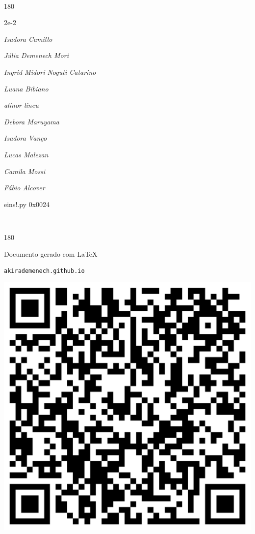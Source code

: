 \documentclass[12pt]{article}
\begin{document}
	\ 
	\vfill
	\begin{turn}{180}	
		\begin{minipage}{\textwidth}
		  	\ttfamily %
			\centering
			{\Huge 2e-2}
		  
			\hfill
		  
			

\textit{\small Isadora Camillo}

\textit{\small Júlia Demenech Mori}

\textit{\small Ingrid Midori Noguti Catarino}

\textit{\small Luana Bibiano}

\textit{\small alinor lineu}

\textit{\small Debora Maruyama}

\textit{\small Isadora Vanço}

\textit{\small Lucas Malezan}

\textit{\small Camila Mossi}

\textit{\small Fábio Alcover}

\bigskip

eins!.py
0x0024


		\end{minipage}	
	\end{turn}
	\vfill
	\

\pagebreak

	\begin{turn}{180}	
		\begin{minipage}{\textwidth}		  
		  Documento gerado com \LaTeX			
		  
		  \texttt{akirademenech.github.io}

		  \includegraphics[height=0.3\textheight]{2e-2.pdf}

		\end{minipage}	
	\end{turn}  
		  
\end{document}
